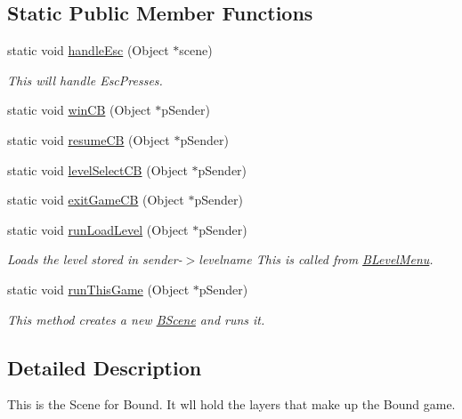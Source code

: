 \subsection*{\-Static \-Public \-Member \-Functions}
\begin{DoxyCompactItemize}
\item 
static void \hyperlink{class_b_scene_aa3e76c81d0eeadf1c6b6f7d9560c14cf}{handle\-Esc} (\-Object $\ast$scene)
\begin{DoxyCompactList}\small\item\em \-This will handle \-Esc\-Presses. \end{DoxyCompactList}\item 
static void \hyperlink{class_b_scene_a8f7e96a35d0d42d5bb57a066519d20d2}{win\-C\-B} (\-Object $\ast$p\-Sender)
\item 
static void \hyperlink{class_b_scene_a25d15df90b25965d88b48c8630da9af3}{resume\-C\-B} (\-Object $\ast$p\-Sender)
\item 
static void \hyperlink{class_b_scene_a57bc71835cfbd1596d639f8ba949b795}{level\-Select\-C\-B} (\-Object $\ast$p\-Sender)
\item 
static void \hyperlink{class_b_scene_a762573ed16243cbe4d6539fbfe36b0e3}{exit\-Game\-C\-B} (\-Object $\ast$p\-Sender)
\item 
static void \hyperlink{class_b_scene_a660fea77a245f644588277b863806105}{run\-Load\-Level} (\-Object $\ast$p\-Sender)
\begin{DoxyCompactList}\small\item\em \-Loads the level stored in sender-\/$>$levelname \-This is called from \hyperlink{class_b_level_menu}{\-B\-Level\-Menu}. \end{DoxyCompactList}\item 
static void \hyperlink{class_b_scene_a90db09771569a058108341368724efc9}{run\-This\-Game} (\-Object $\ast$p\-Sender)
\begin{DoxyCompactList}\small\item\em \-This method creates a new \hyperlink{class_b_scene}{\-B\-Scene} and runs it. \end{DoxyCompactList}\end{DoxyCompactItemize}


\subsection{\-Detailed \-Description}
\-This is the \-Scene for \-Bound. \-It wll hold the layers that make up the \-Bound game. 

